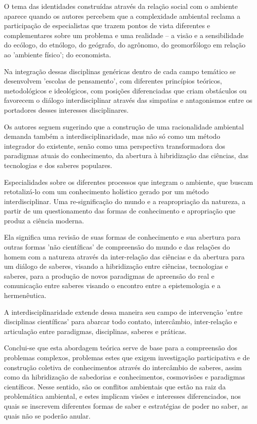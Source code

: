 \documentclass[
   article,       %
   12pt,          %
   oneside,       %
   a4paper,       %
   english,       %
   brazil,           %
   sumario=tradicional
   ]{abntex2}
\begin{document}
O tema das identidades construídas através da relação social com o ambiente aparece quando os autores percebem que a complexidade ambiental reclama a participação de especialistas que trazem pontos de vista diferentes e complementares sobre um problema e uma realidade – a visão e a sensibilidade do ecólogo, do etnólogo, do geógrafo, do agrônomo, do geomorfólogo em relação ao 'ambiente físico'; do economista. 

Na integração dessas disciplinas genéricas dentro de cada campo temático se desenvolvem 'escolas de pensamento', com diferentes princípios teóricos, metodológicos e ideológicos, com posições diferenciadas que criam obstáculos ou favorecem o diálogo interdisciplinar através das simpatias e antagonismos entre os portadores desses interesses disciplinares. 

Os autores seguem sugerindo que a construção de uma racionalidade ambiental demanda também a interdisciplinaridade, mas não só como um método integrador do existente, senão como uma perspectiva transformadora dos paradigmas atuais do conhecimento, da abertura à hibridização das ciências, das tecnologias e dos saberes populares. 

Especialidades sobre os diferentes processos que integram o ambiente, que buscam retotalizá-lo com um conhecimento holístico gerado por um método interdisciplinar. Uma re-significação do mundo e a reapropriação da natureza, a partir de um questionamento das formas de conhecimento e apropriação que produz a ciência moderna. 

Ela significa uma revisão de suas formas de conhecimento e sua abertura para outras formas 'não científicas' de compreensão do mundo e das relações do homem com a natureza através da inter-relação das ciências e da abertura para um diálogo de saberes, visando a hibridização entre ciências, tecnologias e saberes, para a produção de novos paradigmas de apreensão do real e comunicação entre saberes visando o encontro entre a epistemologia e a hermenêutica. 

A interdisciplinaridade extende dessa maneira seu campo de intervenção 'entre disciplinas científicas' para abarcar todo contato, intercâmbio, inter-relação e articulação entre paradigmas, disciplinas, saberes e práticas. 

Conclui-se que esta abordagem teórica serve de base para a compreensão dos problemas complexos, problemas estes que exigem investigação participativa e de construção coletiva de conhecimentos através do intercâmbio de saberes, assim como da hibridização de sabedorias e conhecimentos, cosmovisões e paradigmas científicos. Nesse sentido, são os conflitos ambientais que estão na raiz da problemática ambiental, e estes implicam visões e interesses diferenciados, nos quais se inscrevem diferentes formas de saber e estratégias de poder no saber, as quais não se poderão anular.
\end{document}
